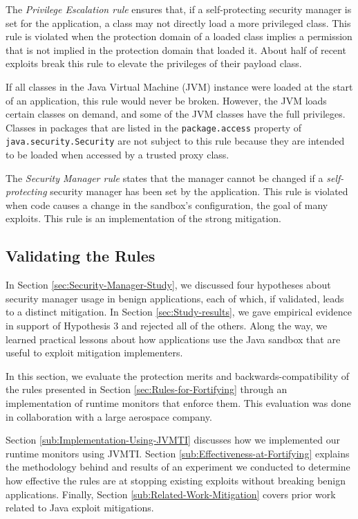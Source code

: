 \documentclass{sig-alternate}
\begin{document}
The \textit{Privilege Escalation rule} ensures that, if a self-protecting
security manager is set for the application, a class may not directly
load a more privileged class. This rule is violated when the protection
domain of a loaded class implies a permission that is not implied
in the protection domain that loaded it. About half of recent exploits
break this rule to elevate the privileges of their payload class.

If all classes in the Java Virtual Machine (JVM) instance were loaded
at the start of an application, this rule would never be broken. However,
the JVM loads certain classes on demand, and some of the JVM classes
have the full privileges. Classes in
packages that are listed in the \texttt{package.access} property of
\texttt{java.security.Security} are not subject to this rule because they are intended to be
loaded when accessed by a trusted proxy class. 

The \textit{Security Manager rule} states that the manager cannot
be changed if a \emph{self-protecting} security manager has been set
by the application. This rule is violated when code causes a change
in the sandbox's configuration, the goal of many exploits. This rule
is an implementation of the strong mitigation.

\subsection{Validating the Rules}\label{sec:Mitigations}

In Section \ref{sec:Security-Manager-Study}, we discussed four hypotheses about security manager usage in benign applications, each
of which, if validated, leads to a distinct mitigation. In Section
\ref{sec:Study-results}, we gave empirical evidence in support of
Hypothesis 3 and rejected all of the others. Along the way, we learned
practical lessons about how applications use the Java sandbox that
are useful to exploit mitigation implementers. 

In this section, we evaluate the protection merits and backwards-compatibility of the rules presented in Section \ref{sec:Rules-for-Fortifying} through an implementation of runtime monitors that enforce them. This evaluation was done in collaboration
with a large aerospace company.

Section \ref{sub:Implementation-Using-JVMTI} discusses how we implemented
our runtime monitors using JVMTI. Section \ref{sub:Effectiveness-at-Fortifying}
explains the methodology behind and results of an experiment we conducted
to determine how effective the rules are at stopping existing exploits without breaking benign applications. Finally, Section
\ref{sub:Related-Work-Mitigation} covers prior work related to Java exploit mitigations.
\end{document}
